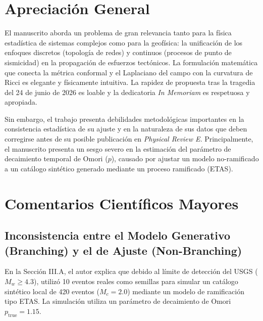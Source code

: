\documentclass[11pt]{article}
\begin{document}
\section{Apreciación General}
El manuscrito aborda un problema de gran relevancia tanto para la física estadística de sistemas complejos como para la geofísica: la unificación de los enfoques discretos (topología de redes) y continuos (procesos de punto de sismicidad) en la propagación de esfuerzos tectónicos. La formulación matemática que conecta la métrica conformal y el Laplaciano del campo con la curvatura de Ricci es elegante y físicamente intuitiva. La rapidez de propuesta tras la tragedia del 24 de junio de 2026 es loable y la dedicatoria \textit{In Memoriam} es respetuosa y apropiada.

Sin embargo, el trabajo presenta debilidades metodológicas importantes en la consistencia estadística de su ajuste y en la naturaleza de sus datos que deben corregirse antes de su posible publicación en \textit{Physical Review E}. Principalmente, el manuscrito presenta un sesgo severo en la estimación del parámetro de decaimiento temporal de Omori ($p$), causado por ajustar un modelo no-ramificado a un catálogo sintético generado mediante un proceso ramificado (ETAS).

\section{Comentarios Científicos Mayores}

\subsection{Inconsistencia entre el Modelo Generativo (Branching) y el de Ajuste (Non-Branching)}
En la Sección III.A, el autor explica que debido al límite de detección del USGS ($M_w \ge 4.3$), utilizó 10 eventos reales como semillas para simular un catálogo sintético local de 420 eventos ($M_c = 2.0$) mediante un modelo de ramificación tipo ETAS. La simulación utiliza un parámetro de decaimiento de Omori $p_{\text{true}} = 1.15$.
\end{document}
